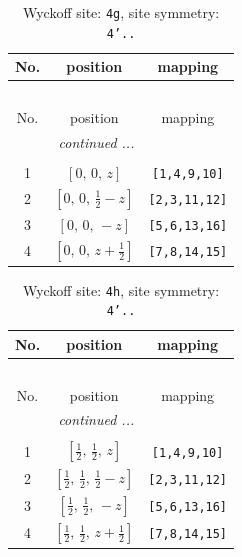 \documentclass[fleqn,8pt]{jsarticle}
\begin{document}
\renewcommand{\arraystretch}{1.2}
\begin{longtable}{ccc}
\caption{Wyckoff site: {\tt 4g}, site symmetry: {\tt 4'..}}
 \\
 \hline \hline
No. & position & mapping \\ \hline \endfirsthead

\multicolumn{2}{l}{\tablename\ \thetable{}} \\
 \hline \hline
No. & position & mapping \\ \hline \endhead

 \hline \hline
\multicolumn{2}{r}{\footnotesize\it continued ...} \\ \endfoot

 \hline \hline
\multicolumn{2}{r}{} \\ \endlastfoot

1 & $\left[ 0,\, 0,\, z \right]$ & {\tt [1,4,9,10]} \\ \hline
2 & $\left[ 0,\, 0,\, \frac{1}{2} - z \right]$ & {\tt [2,3,11,12]} \\ \hline
3 & $\left[ 0,\, 0,\, - z \right]$ & {\tt [5,6,13,16]} \\ \hline
4 & $\left[ 0,\, 0,\, z + \frac{1}{2} \right]$ & {\tt [7,8,14,15]} \\
\end{longtable}
\renewcommand{\arraystretch}{1.2}
\begin{longtable}{ccc}
\caption{Wyckoff site: {\tt 4h}, site symmetry: {\tt 4'..}}
 \\
 \hline \hline
No. & position & mapping \\ \hline \endfirsthead

\multicolumn{2}{l}{\tablename\ \thetable{}} \\
 \hline \hline
No. & position & mapping \\ \hline \endhead

 \hline \hline
\multicolumn{2}{r}{\footnotesize\it continued ...} \\ \endfoot

 \hline \hline
\multicolumn{2}{r}{} \\ \endlastfoot

1 & $\left[ \frac{1}{2},\, \frac{1}{2},\, z \right]$ & {\tt [1,4,9,10]} \\ \hline
2 & $\left[ \frac{1}{2},\, \frac{1}{2},\, \frac{1}{2} - z \right]$ & {\tt [2,3,11,12]} \\ \hline
3 & $\left[ \frac{1}{2},\, \frac{1}{2},\, - z \right]$ & {\tt [5,6,13,16]} \\ \hline
4 & $\left[ \frac{1}{2},\, \frac{1}{2},\, z + \frac{1}{2} \right]$ & {\tt [7,8,14,15]} \\
\end{longtable}
\end{document}
